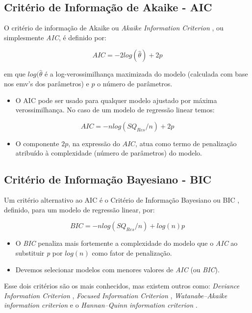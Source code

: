 \subsection{Critério de Informação de Akaike - AIC}

\noindent O critério de informação de Akaike ou \textit{Akaike Information Criterion} \cite{akaike1974new}, ou
simplesmente \textit{AIC}, é definido por:

$$AIC=-2 log(\widehat{\theta})+2p$$

\noindent em que $log(\widehat{\theta}$ é a log-verossimilhança maximizada do modelo (calculada com base nos emv’s dos parâmetros) e $p$ o número de parâmetros.

\begin{itemize}
\item O AIC pode ser usado para qualquer modelo ajustado por máxima verossimilhança. No caso de um modelo de regressão linear temos:
\end{itemize}

$$AIC=-n log(SQ_{Res}/n)+2p$$

\begin{itemize}
\item O componente $2p$, na expressão do $AIC$, atua como termo de penalização atribuído à complexidade (número de parâmetros) do modelo.
\end{itemize}

\subsection{Critério de Informação Bayesiano - BIC}

\noindent Um critério alternativo ao AIC é o Critério de Informação Bayesiano ou BIC \cite{schwarz1978estimating}, definido, para um modelo de regressão linear, por:

$$BIC=-n log(SQ_{Res}/n)+log(n)p$$

\begin{itemize}
\item O \textit{BIC} penaliza mais fortemente a complexidade do modelo que o \textit{AIC}
ao substituir \textit{p} por $log(n)$ como fator de penalização.
\item Devemos selecionar modelos com menores valores de \textit{AIC} (ou \textit{BIC}).
\end{itemize}

\noindent Esse dois critérios são os mais conhecidos, mas existem outros como: \textit{Deviance Information Criterion} \cite{spiegelhalter2002bayesian}, \textit{Focused Information Criterion} \cite{claeskens2003focused}, \textit{Watanabe–Akaike information criterion} \cite{watanabe2013widely} e o \textit{Hannan–Quinn information criterion} \cite{hannan1979determination}.






